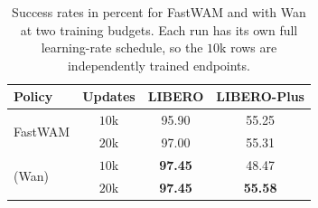 \begin{table}[ht]
\vspace{-2mm}
\caption{Success rates in percent for FastWAM and \modelname{} with Wan at two training budgets. Each run has its own full learning-rate schedule, so the $10$k rows are independently trained endpoints.}
\label{tab:budget}
\begin{center}
\small\setlength{\tabcolsep}{7pt}
\begin{tabular}{lccc}
\toprule
Policy & Updates & LIBERO & LIBERO-Plus \\
\midrule
\multirow{2}{*}{FastWAM} & $10$k & 95.90 & 55.25 \\
 & $20$k & 97.00 & 55.31 \\
\midrule
\multirow{2}{*}{\modelname{} (Wan)} & $10$k & \textbf{97.45} & 48.47 \\
 & $20$k & \textbf{97.45} & \textbf{55.58} \\
\bottomrule
\end{tabular}
\end{center}
\vspace{-2mm}
\end{table}
